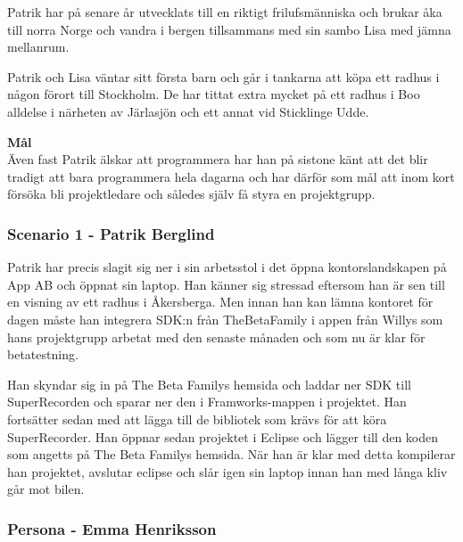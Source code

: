 Patrik har på senare år utvecklats till en riktigt frilufsmänniska och brukar åka till norra Norge och vandra i bergen tillsammans med sin sambo Lisa med jämna mellanrum.

Patrik och Lisa väntar sitt första barn och går i tankarna att köpa ett radhus i någon förort till Stockholm. De har tittat extra mycket på ett radhus i Boo alldelse i närheten av Järlasjön och ett annat vid Sticklinge Udde.

\textbf{Mål}\\
Även fast Patrik älskar att programmera har han på sistone känt att det blir tradigt att bara programmera hela dagarna och har därför som mål att inom kort försöka bli projektledare och således själv få styra en projektgrupp.
\newpage

\subsubsection{Scenario 1 - Patrik Berglind}
Patrik har precis slagit sig ner i sin arbetsstol i det öppna kontorslandskapen på App AB och öppnat sin laptop. Han känner sig stressad eftersom han är sen till en visning av ett radhus i Åkersberga. Men innan han kan lämna kontoret för dagen måste han integrera SDK:n från TheBetaFamily i appen från Willys som hans projektgrupp arbetat med den senaste månaden och som nu är klar för betatestning.

Han skyndar sig in på The Beta Familys hemsida och laddar ner SDK till SuperRecorden och sparar ner den i Framworks-mappen i projektet. Han fortsätter sedan med att lägga till de bibliotek som krävs för att köra SuperRecorder. Han öppnar sedan projektet i Eclipse och lägger till den koden som angetts på The Beta Familys hemsida. När han är klar med detta kompilerar han projektet, avslutar eclipse och slår igen sin laptop innan han med långa kliv går mot bilen.
\newpage
\subsubsection{Persona - Emma Henriksson}

\vspace{40px}

